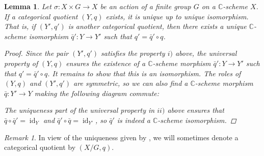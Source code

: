 \documentclass[12pt,a4paper]{amsart}
\theoremstyle{plain}
\newtheorem{lm}[thm]{Lemma}
\theoremstyle{definition}
\theoremstyle{remark}
\newtheorem{rem}[thm]{Remark}
\begin{document}
\begin{lm}\label{lm:uniquequotient}
  Let $\sigma \colon X \times G \to X$ be an action of a finite group $G$ on a $\mathbb{C}$-scheme $X$.
  If a categorical quotient $(Y,q)$ exists, it is unique up to unique isomorphism.
  That is, if $(Y', q')$ is another categorical quotient, then there exists a unique $\mathbb{C}$-scheme isomorphism $\bar{q}' \colon Y \to Y'$ such that $q' = \bar{q}' \circ q$.
  
  \begin{proof}
    Since the pair $(Y', q')$ satisfies the property $i)$ above, the universal property of $(Y, q)$ ensures the existence of a $\mathbb{C}$-scheme morphism $\bar{q}' \colon Y \to Y'$ such that $q' = \bar{q}' \circ q$.
    It remains to show that this is an isomorphism.
    The roles of $(Y, q)$ and $(Y', q')$ are symmetric, so we can also find a $\mathbb{C}$-scheme morphism $\bar{q} \colon Y' \to Y$ making the following diagram commute:

    \begin{center}
    \end{center}

    The uniqueness part of the universal property in $ii)$ above ensures that $\bar{q} \circ \bar{q}' = \operatorname{id}_{Y}$ and $\bar{q}' \circ \bar{q} = \operatorname{id}_{Y'}$, so $\bar{q}'$ is indeed a $\mathbb{C}$-scheme isomorphism.

  \end{proof}
\end{lm}

\begin{rem}
  In view of the uniqueness given by , we will sometimes denote a categorical quotient by $(X/G, q)$.
\end{rem}
\end{document}
